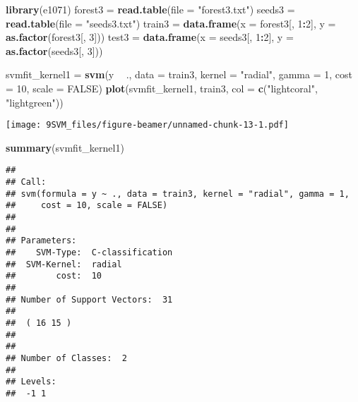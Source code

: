 \documentclass[10pt,ignorenonframetext,]{beamer}
\newenvironment{Shaded}{\begin{snugshade}}{\end{snugshade}}
\newcommand{\KeywordTok}[1]{\textcolor[rgb]{0.13,0.29,0.53}{\textbf{#1}}}
\newcommand{\DataTypeTok}[1]{\textcolor[rgb]{0.13,0.29,0.53}{#1}}
\newcommand{\DecValTok}[1]{\textcolor[rgb]{0.00,0.00,0.81}{#1}}
\newcommand{\StringTok}[1]{\textcolor[rgb]{0.31,0.60,0.02}{#1}}
\newcommand{\OtherTok}[1]{\textcolor[rgb]{0.56,0.35,0.01}{#1}}
\newcommand{\OperatorTok}[1]{\textcolor[rgb]{0.81,0.36,0.00}{\textbf{#1}}}
\newcommand{\NormalTok}[1]{#1}
\begin{document}
\begin{frame}[fragile]

\footnotesize

\begin{Shaded}
\begin{Highlighting}[]
\KeywordTok{library}\NormalTok{(e1071)}
\NormalTok{forest3 =}\StringTok{ }\KeywordTok{read.table}\NormalTok{(}\DataTypeTok{file =} \StringTok{"forest3.txt"}\NormalTok{)}
\NormalTok{seeds3 =}\StringTok{ }\KeywordTok{read.table}\NormalTok{(}\DataTypeTok{file =} \StringTok{"seeds3.txt"}\NormalTok{)}
\NormalTok{train3 =}\StringTok{ }\KeywordTok{data.frame}\NormalTok{(}\DataTypeTok{x =}\NormalTok{ forest3[, }\DecValTok{1}\OperatorTok{:}\DecValTok{2}\NormalTok{], }\DataTypeTok{y =} \KeywordTok{as.factor}\NormalTok{(forest3[, }\DecValTok{3}\NormalTok{]))}
\NormalTok{test3 =}\StringTok{ }\KeywordTok{data.frame}\NormalTok{(}\DataTypeTok{x =}\NormalTok{ seeds3[, }\DecValTok{1}\OperatorTok{:}\DecValTok{2}\NormalTok{], }\DataTypeTok{y =} \KeywordTok{as.factor}\NormalTok{(seeds3[, }\DecValTok{3}\NormalTok{]))}
\end{Highlighting}
\end{Shaded}

\end{frame}

\begin{frame}[fragile]

\begin{Shaded}
\begin{Highlighting}[]
\NormalTok{svmfit_kernel1 =}\StringTok{ }\KeywordTok{svm}\NormalTok{(y }\OperatorTok{~}\StringTok{ }\NormalTok{., }\DataTypeTok{data =}\NormalTok{ train3, }\DataTypeTok{kernel =} \StringTok{"radial"}\NormalTok{, }\DataTypeTok{gamma =} \DecValTok{1}\NormalTok{, }
    \DataTypeTok{cost =} \DecValTok{10}\NormalTok{, }\DataTypeTok{scale =} \OtherTok{FALSE}\NormalTok{)}
\KeywordTok{plot}\NormalTok{(svmfit_kernel1, train3, }\DataTypeTok{col =} \KeywordTok{c}\NormalTok{(}\StringTok{"lightcoral"}\NormalTok{, }\StringTok{"lightgreen"}\NormalTok{))}
\end{Highlighting}
\end{Shaded}

\texttt{[image: 9SVM\_files/figure-beamer/unnamed-chunk-13-1.pdf]}

\begin{Shaded}
\begin{Highlighting}[]
\KeywordTok{summary}\NormalTok{(svmfit_kernel1)}
\end{Highlighting}
\end{Shaded}

\begin{verbatim}
## 
## Call:
## svm(formula = y ~ ., data = train3, kernel = "radial", gamma = 1, 
##     cost = 10, scale = FALSE)
## 
## 
## Parameters:
##    SVM-Type:  C-classification 
##  SVM-Kernel:  radial 
##        cost:  10 
## 
## Number of Support Vectors:  31
## 
##  ( 16 15 )
## 
## 
## Number of Classes:  2 
## 
## Levels: 
##  -1 1
\end{verbatim}

\normalsize

\end{frame}
\end{document}
